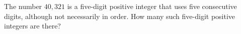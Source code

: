The number $40{,}321$ is a five-digit positive integer that uses five consecutive digits, although not necessarily in order. How many such five-digit positive integers are there?
